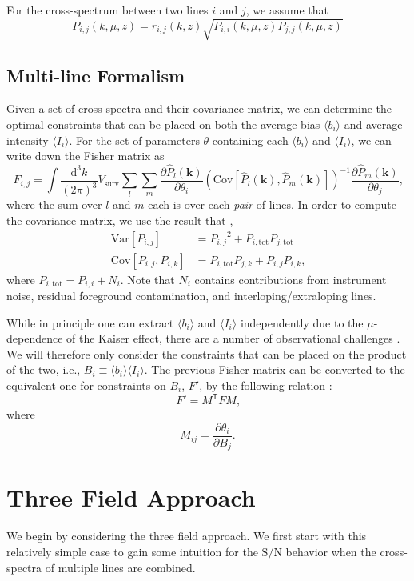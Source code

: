 \documentclass{aastex62}
\newcommand{\beq}{\begin{equation}}
\newcommand{\eeq}{\end{equation}}
\newcommand{\ps}[1]{\ensuremath{P_{#1,#1}}}
\newcommand{\xps}[2]{\ensuremath{P_{#1,#2}}}
\newcommand{\pstot}[1]{\ensuremath{P_{#1,\text{tot}}}}
\newcommand{\Var}[1]{\mathrm{Var}[#1]}
\newcommand{\Cov}[2]{\mathrm{Cov}[#1,#2]}
\newcommand{\avg}[1]{\ensuremath{\langle #1 \rangle}}
\newcommand{\SN}{\ensuremath{\text{S}/\text{N}}}
\newcommand{\bi}{\ensuremath{\avg{b_i}}}
\newcommand{\Ii}{\ensuremath{\avg{I_i}}}
\begin{document}
For the cross-spectrum between two lines $i$ and $j$, we assume that
\beq\label{eq:cross_spec}
P_{i,j}(k, \mu, z) = r_{i,j}(k, z) \sqrt{P_{i,i}(k, \mu, z) P_{j,j}(k, \mu, z)}
\eeq

\subsection{Multi-line Formalism}\label{ssec:multi_line}
Given a set of cross-spectra and their covariance matrix, we can determine the
optimal constraints that can be placed on both the average bias $\avg{b_i}$
and average intensity $\avg{I_i}$. For the set of parameters $\theta$
containing each $\avg{b_i}$ and $\avg{I_i}$, we can write down the Fisher
matrix as
\beq\label{eq:fisher}
F_{i,j} = 
\int \frac{\text{d}^3k}{(2\pi)^3} V_{\text{surv}}
\sum_{l} \sum_{m}
\frac{\partial \hat{P}_{l}(\bm{k})}{\partial \theta_i}
\left(\Cov{\hat{P}_{l}(\bm{k})}{\hat{P}_{m}(\bm{k})}\right)^{-1}
\frac{\partial \hat{P}_{m}(\bm{k})}{\partial \theta_j}\text{,}
\eeq
where the sum over $l$ and $m$ each is over each \emph{pair} of lines. In
order to compute the covariance matrix, we use the result that \citep[e.g.][]{2010JCAP...11..016V},
\beq\label{eq:var_cov}
\begin{split}
\Var{\xps{i}{j}} &= \xps{i}{j}^2 + \pstot{i}\pstot{j} \\
\Cov{\xps{i}{j}}{\xps{i}{k}} &= \pstot{i}\xps{j}{k} +
\xps{i}{j}\xps{i}{k}\text{,}
\end{split}
\eeq
where $\pstot{i} = \ps{i} + N_i$. Note that $N_i$ contains contributions from
instrument noise, residual foreground contamination, and
interloping/extraloping lines.

While in principle one can extract $\bi$ and $\Ii$ independently due to the
$\mu$-dependence of the Kaiser effect, there are a number of observational
challenges \citep{2019arXiv190500209C}. We will therefore only consider the constraints
that can be placed on the product of the two, i.e., $B_i \equiv \bi \Ii$. The
previous Fisher matrix can be converted to the equivalent one for constraints
on $B_i$, $F'$, by the following relation \citep[e.g.][]{2009arXiv0906.4123C}:
\beq\label{eq:fisher_transform}
F' = M^{\mathsf{T}} F M\text{,}
\eeq
where
\beq\label{eq:trans_matrix}
M_{ij} = \frac{\partial \theta_i}{\partial B_j}\text{.}
\eeq

\section{Three Field Approach}\label{sec:tf}
We begin by considering the three field approach. We first start with this
relatively simple case to gain some intuition for the \SN{} behavior when the
cross-spectra of multiple lines are combined.
\end{document}
